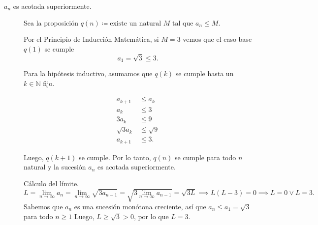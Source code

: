 \documentclass[
	spanish,
	8pt,
	utf8,
	xcolor=table,
	handout,
	aspectratio=169,
	professionalfonts,
	mathserif,
	leqno,
]{beamer}
\begin{document}
\begin{frame}
	\begin{solution}
		\begin{description}
			\item[$a_{n}$ es acotada superiormente.]

				Sea la proposición $q\left(n\right)\coloneqq\text{existe un natural $M$ tal que $a_n\leq M$}$.

				Por el \alert{Principio de Inducción Matemática}, si $M=3$ vemos que el caso base
				$q\left(1\right)$ se cumple
				\begin{equation*}
					a_{1}=\sqrt{3}\leq 3.
				\end{equation*}

				Para la hipótesis inductivo, asumamos que $q\left(k\right)$ se
				cumple hasta un $k\in\mathbb{N}$ fijo.

				\begin{align*}
					a_{k+1}       & \leq a_{k}   \\
					a_{k}         & \leq 3       \\
					3a_{k}        & \leq 9       \\
					\sqrt{3a_{k}} & \leq\sqrt{9} \\
					a_{k+1}       & \leq 3.
				\end{align*}

				Luego, $q\left(k+1\right)$ se cumple.
				Por lo tanto, $q\left(n\right)$ se cumple para todo $n$ natural
				y la sucesión $a_{n}$ es acotada superiormente.

				\alert{Cálculo del límite.}
				\begin{equation*}
					L=\lim\limits_{n\to\infty}a_{n}=
					\lim\limits_{n\to\infty}\sqrt{3a_{n-1}}=
					\sqrt{3\lim\limits_{n\to\infty}a_{n-1}}=
					\sqrt{3L}
					\implies
					L\left(L-3\right)=0
					\implies
					L=0 \vee L=3.
				\end{equation*}
				Sabemos que $a_{n}$ es una sucesión monótona creciente, así
				que $a_{n}\leq a_{1}=\sqrt{3}$ para todo $n\geq1$
				Luego, $L\geq\sqrt{3}>0$, por lo que $L=3$.
		\end{description}
	\end{solution}
\end{frame}


\end{document}

